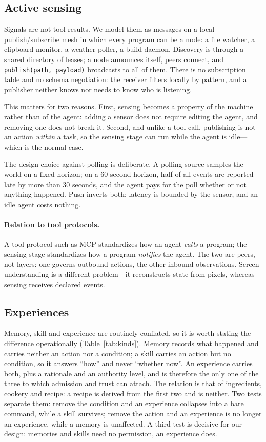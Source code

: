 \documentclass[10pt,a4paper]{article}
\begin{document}
\subsection{Active sensing}

Signals are not tool results. We model them as messages on a local
publish/subscribe mesh in which every program can be a node: a file watcher,
a clipboard monitor, a weather poller, a build daemon. Discovery is through a
shared directory of leases; a node announces itself, peers connect, and
\verb|publish(path, payload)| broadcasts to all of them. There is no
subscription table and no schema negotiation: the receiver filters locally by
pattern, and a publisher neither knows nor needs to know who is listening.

This matters for two reasons. First, sensing becomes a property of the
machine rather than of the agent: adding a sensor does not require editing
the agent, and removing one does not break it. Second, and unlike a tool
call, publishing is not an action \emph{within} a task, so the sensing stage
can run while the agent is idle---which is the normal case.

The design choice against polling is deliberate. A polling source samples
the world on a fixed horizon; on a 60-second horizon, half of all events are
reported late by more than 30 seconds, and the agent pays for the poll
whether or not anything happened. Push inverts both: latency is bounded by
the sensor, and an idle agent costs nothing.

\paragraph{Relation to tool protocols.}
A tool protocol such as MCP standardizes how an agent \emph{calls} a program; the sensing stage standardizes how a program \emph{notifies} the agent. The two are peers, not layers: one governs outbound actions, the other inbound observations. Screen understanding is a different problem---it reconstructs state from pixels, whereas sensing receives declared events.

\subsection{Experiences}

Memory, skill and experience are routinely conflated, so it is worth stating the difference operationally (Table~\ref{tab:kinds}). Memory records what happened and carries neither an action nor a condition; a skill carries an action but no condition, so it answers ``how'' and never ``whether now''. An experience carries both, plus a rationale and an authority level, and is therefore the only one of the three to which admission and trust can attach. The relation is that of ingredients, cookery and recipe: a recipe is derived from the first two and is neither. Two tests separate them: remove the condition and an experience collapses into a bare command, while a skill survives; remove the action and an experience is no longer an experience, while a memory is unaffected. A third test is decisive for our design: memories and skills need no permission, an experience does.
\end{document}
